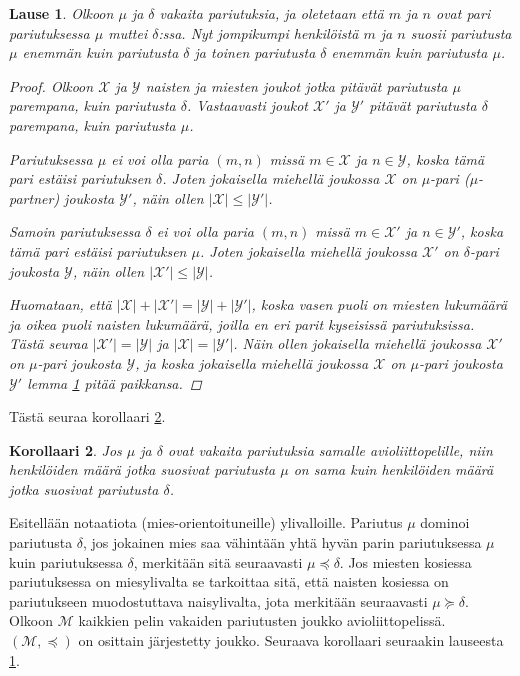 \documentclass[finnish]{tktltiki2}
\newtheorem{lau}{Lause}
\newtheorem{kor}[lau]{Korollaari}
\theoremstyle{definition}
\theoremstyle{remark}
\begin{document}
\begin{lau} \cite[p. 18]{gusfield1989stable}\label{lause-guspref}
	Olkoon $\mu$ ja $\delta$ vakaita pariutuksia, ja oletetaan että $m$ ja $n$ ovat pari pariutuksessa $\mu$ muttei $\delta$:ssa. Nyt jompikumpi henkilöistä $m$ ja $n$ suosii pariutusta $\mu$ enemmän kuin pariutusta $\delta$ ja toinen pariutusta $\delta$ enemmän kuin pariutusta $\mu$.
\begin{proof} \cite[s. 18]{gusfield1989stable}
Olkoon $\mathcal{X}$ ja $\mathcal{Y}$ naisten ja miesten joukot jotka pitävät pariutusta $\mu$ parempana, kuin pariutusta $\delta$. Vastaavasti joukot $\mathcal{X}'$ ja $\mathcal{Y}'$ pitävät pariutusta $\delta$ parempana, kuin pariutusta $\mu$.

Pariutuksessa $\mu$ ei voi olla paria $(m, n)$ missä $m \in \mathcal{X}$ ja $n \in \mathcal{Y}$, koska tämä pari estäisi pariutuksen $\delta$. Joten jokaisella miehellä joukossa $\mathcal{X}$ on $\mu$-pari (\emph{$\mu$-partner}) joukosta $\mathcal{Y'}$, näin ollen $|\mathcal{X}| \leq |\mathcal{Y'}|$.

Samoin pariutuksessa $\delta$ ei voi olla paria $(m, n)$ missä $m \in \mathcal{X}'$ ja $n \in \mathcal{Y}'$, koska tämä pari estäisi pariutuksen $\mu$. Joten jokaisella miehellä joukossa $\mathcal{X}'$ on $\delta$-pari joukosta $\mathcal{Y}$, näin ollen $|\mathcal{X}'| \leq |\mathcal{Y}|$.

Huomataan, että $|\mathcal{X}| + |\mathcal{X}'| = |\mathcal{Y}| + |\mathcal{Y}'|$, koska vasen puoli on miesten lukumäärä ja oikea puoli naisten lukumäärä, joilla en eri parit kyseisissä pariutuksissa. Tästä seuraa $|\mathcal{X}'| = |\mathcal{Y}|$ ja $|\mathcal{X}| = |\mathcal{Y}'|$. Näin ollen jokaisella miehellä joukossa $\mathcal{X}'$ on $\mu$-pari joukosta $\mathcal{Y}$, ja koska jokaisella miehellä joukossa $\mathcal{X}$ on $\mu$-pari joukosta $\mathcal{Y}'$ lemma \ref{lause-guspref} pitää paikkansa.
\end{proof}
\end{lau}

Tästä seuraa korollaari \ref{eqkor}.

\begin{kor}\cite[s. 18]{gusfield1989stable}\label{eqkor}
Jos $\mu$ ja $\delta$ ovat vakaita pariutuksia samalle avioliittopelille, niin henkilöiden määrä jotka suosivat pariutusta $\mu$ on sama kuin henkilöiden määrä jotka suosivat pariutusta $\delta$.
\end{kor}

Esitellään notaatiota (mies-orientoituneille) ylivalloille. Pariutus $\mu$ dominoi pariutusta $\delta$, jos jokainen mies saa vähintään yhtä hyvän parin pariutuksessa $\mu$ kuin pariutuksessa $\delta$, merkitään sitä seuraavasti $\mu \preceq \delta$.
Jos miesten kosiessa pariutuksessa on miesylivalta se tarkoittaa sitä, että naisten kosiessa on pariutukseen muodostuttava naisylivalta, jota merkitään seuraavasti $\mu \succeq \delta$. Olkoon $\mathcal{M}$ kaikkien pelin vakaiden pariutusten joukko avioliittopelissä. $(\mathcal{M}, \preceq)$ on osittain järjestetty joukko.
Seuraava korollaari seuraakin lauseesta \ref{lause-guspref}.
\end{document}
